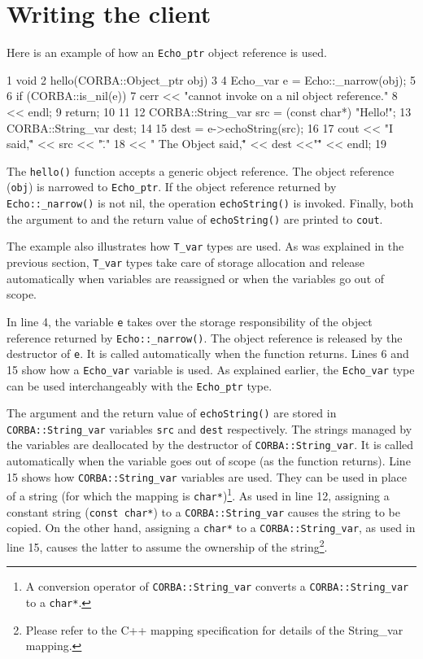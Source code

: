 \documentclass[11pt,oneside,a4paper]{book}
\newcommand{\type}[1]{\texttt{#1}}
\newcommand{\code}[1]{\texttt{#1}}
\newcommand{\op}[1]{\texttt{#1()}}
\newcommand{\dsc}{\discretionary{}{}{}}
\begin{document}
\section{Writing the client}

Here is an example of how an \type{Echo\_ptr} object reference is
used.

\lstset{numbers=left,gobble=4}
\begin{cxxlisting}
 1  void
 2  hello(CORBA::Object_ptr obj)
 3  {
 4    Echo_var e = Echo::_narrow(obj);
 5
 6    if (CORBA::is_nil(e)) {
 7      cerr << "cannot invoke on a nil object reference."
 8           << endl;
 9      return;
10    }
11
12    CORBA::String_var src = (const char*) "Hello!";
13    CORBA::String_var dest;
14
15    dest = e->echoString(src);
16
17    cout << "I said,\"" << src << "\"."
18         << " The Object said,\"" << dest <<"\"" << endl;
19  }
\end{cxxlisting}
\lstset{numbers=none,gobble=0}

The \op{hello} function accepts a generic object reference.  The
object reference (\code{obj}) is narrowed to \type{Echo\_ptr}. If the
object reference returned by \op{Echo::\dsc{}\_narrow} is not nil, the
operation \op{echoString} is invoked. Finally, both the argument to
and the return value of \op{echoString} are printed to \code{cout}.

The example also illustrates how \type{T\_var} types are used. As was
explained in the previous section, \type{T\_var} types take care of
storage allocation and release automatically when variables are
reassigned or when the variables go out of scope.

In line 4, the variable \code{e} takes over the storage responsibility
of the object reference returned by \op{Echo::\_narrow}. The object
reference is released by the destructor of \code{e}. It is called
automatically when the function returns. Lines 6 and 15 show how a
\type{Echo\_var} variable is used. As explained earlier, the
\type{Echo\_var} type can be used interchangeably with the
\type{Echo\_ptr} type.

The argument and the return value of \op{echoString} are stored in
\type{CORBA::\dsc{}String\_var} variables \code{src} and \code{dest}
respectively. The strings managed by the variables are deallocated by
the destructor of \type{CORBA::String\_var}. It is called
automatically when the variable goes out of scope (as the function
returns). Line 15 shows how \type{CORBA::String\_var} variables are
used. They can be used in place of a string (for which the mapping is
\type{char*})\footnote{A conversion operator of
\type{CORBA::String\_var} converts a \type{CORBA::\dsc{}String\_var}
to a \type{char*}.}. As used in line 12, assigning a constant string
(\type{const char*}) to a \type{CORBA::String\_var} causes the string
to be copied. On the other hand, assigning a \type{char*} to a
\type{CORBA::String\_var}, as used in line 15, causes the latter to
assume the ownership of the string\footnote{Please refer to the C++
mapping specification for details of the String\_var mapping.}.
\end{document}
